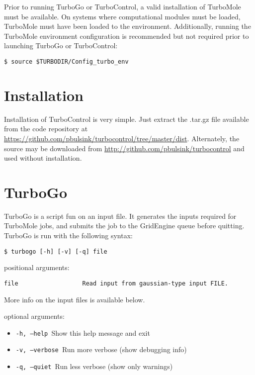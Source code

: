 Prior to running TurboGo or TurboControl, a valid installation of TurboMole must be available. On systems where computational modules must be loaded, TurboMole must have been loaded to the environment. Additionally, running the TurboMole environment configuration is recommended but not required prior to launching TurboGo or TurboControl:

\begin{center}
\begin{verbatim}
$ source $TURBODIR/Config_turbo_env
\end{verbatim}
\end{center}

\section{Installation}
Installation of TurboControl is very simple. Just extract the .tar.gz file available from the code repository at \url{https://github.com/pbulsink/turbocontrol/tree/master/dist}. Alternately, the source may be downloaded from \url{http://github.com/pbulsink/turbocontrol} and used without installation.

\section{TurboGo}

TurboGo is a script fun on an input file. It generates the inputs required for TurboMole jobs, and submits the job to the GridEngine queue before quitting. TurboGo is run with the following syntax:

\begin{center}
\begin{verbatim}
$ turbogo [-h] [-v] [-q] file
\end{verbatim}
\end{center}

positional arguments:

\begin{Verbatim}[baselinestretch=0.75]
file                  Read input from gaussian-type input FILE.
\end{Verbatim}

More info on the input files is available below.

optional arguments:

\begin{itemize}
\item \texttt{-h, --help            }Show this help message and exit
\item \texttt{-v, --verbose         }Run more verbose (show debugging info)
\item \texttt{-q, --quiet           }Run less verbose (show only warnings)
\end{itemize}


